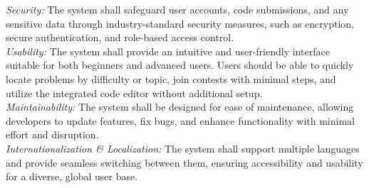\noindent \textit{Security:} The system shall safeguard user accounts, code submissions, and any sensitive data through industry-standard security measures, such as encryption, secure authentication, and role-based access control.\\

\noindent \textit{Usability:} The system shall provide an intuitive and user-friendly interface suitable for both beginners and advanced users. Users should be able to quickly locate problems by difficulty or topic, join contests with minimal steps, and utilize the integrated code editor without additional setup.\\

\noindent \textit{Maintainability:} The system shall be designed for ease of maintenance, allowing developers to update features, fix bugs, and enhance functionality with minimal effort and disruption.\\

\noindent \textit{Internationalization \& Localization:} The system shall support multiple languages and provide seamless switching between them, ensuring accessibility and usability for a diverse, global user base.